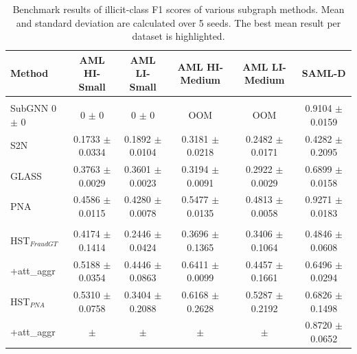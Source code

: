 \documentclass[12pt, twocolumn]{report}
\begin{document}
\begin{table}[t]
    \centering
    \caption{Benchmark results of illicit-class F1 scores of various subgraph methods. Mean and standard deviation are calculated over 5 seeds. The best mean result per dataset is \textcolor{OliveGreen}{highlighted}.}
    \vspace{0.2cm}
    \begin{tabular}{>{\footnotesize}l >{\footnotesize}c >{\footnotesize}c >{\footnotesize}c >{\footnotesize}c >{\footnotesize}c}
        \hline
        {Method} & AML HI-Small & AML LI-Small & AML HI-Medium & AML LI-Medium & SAML-D \\
        \hline\\[-2.3ex]
        SubGNN 0 $\pm$ 0 & 0 $\pm$ 0 & 0 $\pm$ 0 & OOM & OOM & 0.9104 $\pm$ 0.0159 \\
        S2N & 0.1733 $\pm$ 0.0334 & 0.1892 $\pm$ 0.0104 & 0.3181 $\pm$ 0.0218 & 0.2482 $\pm$ 0.0171 & 0.4282 $\pm$ 0.2095 \\
        GLASS & 0.3763 $\pm$ 0.0029 & 0.3601 $\pm$ 0.0023 & 0.3194 $\pm$ 0.0091 & 0.2922 $\pm$ 0.0029 & 0.6899 $\pm$ 0.0158 \\
        PNA & 0.4586 $\pm$ 0.0115 & 0.4280 $\pm$ 0.0078 & 0.5477 $\pm$ 0.0135 & {0.4813 $\pm$ 0.0058} & \textcolor{OliveGreen}{0.9271 $\pm$ 0.0183} \\
        \hline\\[-2.3ex]
        HST$_{FraudGT}$ & 0.4174 $\pm$ 0.1414 & 0.2446 $\pm$ 0.0424 & 0.3696 $\pm$ 0.1365 & 0.3406 $\pm$ 0.1064 & 0.4846 $\pm$ 0.0608 \\
        \quad +att\_aggr & {0.5188 $\pm$ 0.0354} & \textcolor{OliveGreen}{0.4446 $\pm$ 0.0863} & \textcolor{OliveGreen}{0.6411 $\pm$ 0.0099} & 0.4457 $\pm$ 0.1661 & 0.6496 $\pm$ 0.0294 \\
        HST$_{PNA}$ & \textcolor{OliveGreen}{0.5310 $\pm$ 0.0758} & 0.3404 $\pm$ 0.2088 & 0.6168 $\pm$ 0.2628 & \textcolor{OliveGreen}{0.5287 $\pm$ 0.2192} & 0.6826 $\pm$ 0.1498 \\
        \quad +att\_aggr & $\pm$ & $\pm$ & $\pm$ & $\pm$ & 0.8720 $\pm$ 0.0652 \\
        \hline
    \end{tabular}
    \label{tab:main-results}
\end{table}
\end{document}
